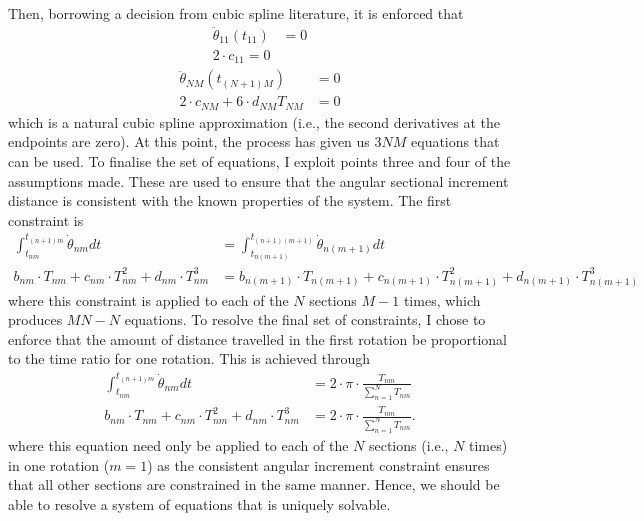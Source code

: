 \documentclass{article}
\begin{document}
	Then, borrowing a decision from cubic spline literature, it is enforced that
	\begin{equation}
		\begin{aligned}
			\ddot{\theta}_{11}(t_{11}) &= 0 \\
			2 \cdot c_{11}  = 0
		\end{aligned}
	\end{equation}
	\begin{equation}
		\begin{aligned}
			\ddot{\theta}_{NM}(t_{(N + 1)M}) &= 0 \\
			2 \cdot c_{NM} + 6 \cdot d_{NM} T_{NM} &= 0
		\end{aligned}
	\end{equation}
	which is a natural cubic spline approximation (i.e., the second derivatives at the endpoints are zero). At this point, the process has given us $3NM$ equations that can be used. To finalise the set of equations, I exploit points three and four of the assumptions made. These are used to ensure that the angular sectional increment distance is consistent with the known properties of the system. The first constraint is
	\begin{equation}
		\begin{aligned}
			\int_{t_{nm}}^{t_{(n+1)m}} \dot{\theta}_{nm}dt &= \int_{t_{n(m + 1)}}^{t_{(n+1)(m + 1)}} \dot{\theta}_{n(m + 1)}dt \\
			b_{nm} \cdot T_{nm} + c_{nm} \cdot T_{nm}^2 + d_{nm} \cdot T_{nm}^3 &= b_{n(m+1)} \cdot T_{n(m+1)} + c_{n(m+1)} \cdot T_{n(m+1)}^2 + d_{n(m+1)} \cdot T_{n(m+1)}^3
		\end{aligned}
	\end{equation} 
	where this constraint is applied to each of the $N$ sections $M-1$ times, which produces $MN - N$ equations. To resolve the final set of constraints, I chose to enforce that the amount of distance travelled in the first rotation be proportional to the time ratio for one rotation. This is achieved through
	\begin{equation}\label{eq:poor_assumption}
		\begin{aligned}
		\int_{t_{nm}}^{t_{(n+1)m}} \dot{\theta}_{nm}dt &= 2 \cdot \pi \cdot \frac{T_{nm}}{\sum_{n=1}^{N}T_{nm}} \\
		b_{nm} \cdot T_{nm} + c_{nm} \cdot T_{nm}^2 + d_{nm} \cdot T_{nm}^3 &= 2 \cdot \pi \cdot \frac{T_{nm}}{\sum_{n=1}^{N}T_{nm}}.
		\end{aligned}
	\end{equation}
	where this equation need only be applied to each of the $N$ sections (i.e., $N$ times) in one rotation ($m = 1$) as the consistent angular increment constraint ensures that all other sections are constrained in the same manner. Hence, we should be able to resolve a system of equations that is uniquely solvable. 
	
\end{document}
